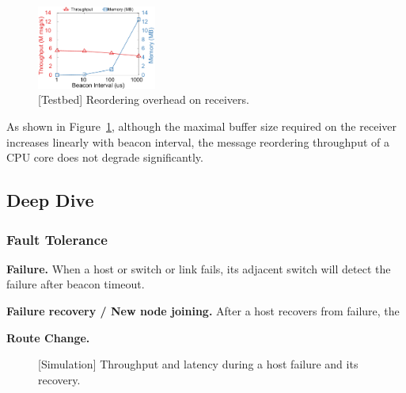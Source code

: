 \begin{figure}[t]
\centering
\includegraphics[width=0.35\textwidth]{gnuplot/reorder_receiver.pdf}
\caption{[Testbed] Reordering overhead on receivers.}
\label{fig:reorder-overhead}
\end{figure}

As shown in Figure~\ref{fig:reorder-overhead}, although the maximal buffer size required on the receiver increases linearly with beacon interval, the message reordering throughput of a CPU core does not degrade significantly.

\iffalse
\subsection{Deep Dive}

\subsubsection{Fault Tolerance}
\label{sec:eval-fault-tolerance}

\textbf{Failure.}
When a host or switch or link fails, its adjacent switch will detect the failure after beacon timeout.

\textbf{Failure recovery / New node joining.}
After a host recovers from failure, the 

\textbf{Route Change.}

\begin{figure}[t]
\centering
	\hspace{0.01\textwidth}
	\caption{[Simulation] Throughput and latency during a host failure and its recovery.}
	\label{fig:failure}
    \vspace{-15pt}
\end{figure}

